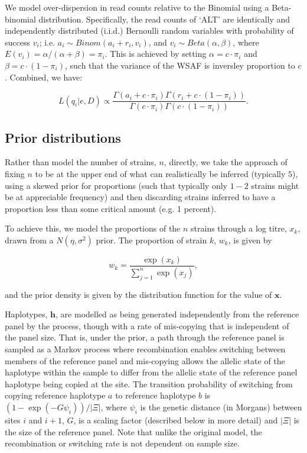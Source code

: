 \documentclass{nature}
\begin{document}
\noindent We model over-dispersion in read counts relative to the Binomial using a Beta-binomial distribution. Specifically, the read counts of `ALT' are identically and independently distributed (i.i.d.) Bernoulli random variables with probability of success $v_i$; i.e. $a_i \sim Binom(a_i + r_i, v_i)$, and $v_i \sim Beta(\alpha, \beta)$, where $E(v_i) = \alpha/(\alpha+\beta) = \pi_{i}$. This is achieved by setting $\alpha = c\cdot \pi_{i} $ and $\beta = c\cdot (1-\pi_{i})$, such that the variance of the WSAF is inversley proportion to $c$.  Combined, we have:

\begin{equation}
L(q_{i}| e, D) \propto \frac{\Gamma(a_i + c\cdot \pi_{i}) \Gamma(r_i + c\cdot (1-\pi_{i}))}{\Gamma(c\cdot \pi_{i})\Gamma(c\cdot (1-\pi_{i}))}. \label{eqn:llk}
\end{equation}


\subsection*{Prior distributions}\label{sec:prior}

Rather than model the number of strains, $n$, directly, we take the approach of fixing $n$ to be at the upper end of what can realistically be inferred (typically $5$), using a skewed prior for proportions (such that typically only $1-2$ strains might be at appreciable frequency) and then discarding strains inferred to have a proportion less than some critical amount (e.g. 1 percent).

To achieve this, we model the proportions of the $n$ strains through a log titre, $x_k$, drawn from a $N(\eta, \sigma^2)$ prior.  The proportion of strain $k$, $w_k$, is given by

\begin{equation}
w_k = \frac{\exp(x_k)}{\sum_{j=1}^n \exp(x_j)},
\end{equation}

\noindent and the prior density is given by the distribution function for the value of $\mathbf{x}$.

Haplotypes, $\mathbf{h}$, are modelled as being generated independently from the reference panel by the \cite{Li2003} process, though with a rate of mis-copying that is independent of the panel size. That is, under the prior, a path through the reference panel is sampled as a Markov process where recombination enables switching between members of the reference panel and mis-copying allows the allelic state of the haplotype within the sample to differ from the allelic state of the reference panel haplotype being copied at the site.  The transition probability of switching from copying reference haplotype $a$ to reference haplotype $b$ is $(1-\exp(-G \psi_i))/|\Xi|$, where $\psi_i$ is the genetic distance (in Morgans) between sites $i$ and $i+1$, $G$, is a scaling factor (described below in more detail) and $|\Xi|$ is the size of the reference panel.  Note that unlike the original model, the recombination or switching rate is not dependent on sample size.
\end{document}
